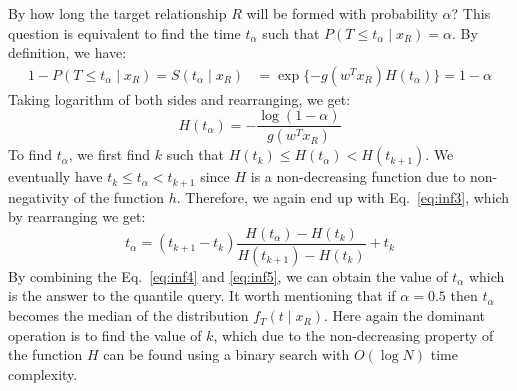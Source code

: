  By how long the target relationship $R$ will be formed with probability $\alpha$? This question is equivalent to find the time $t_\alpha$ such that $P(T \le t_\alpha\mid x_R)=\alpha$. By definition, we have:
\begin{equation*}
\begin{split}
1-P(T \le t_\alpha\mid x_R)=S(t_\alpha\mid x_R)&=\exp\{-g({w}^Tx_R){H}(t_\alpha)\}=1-\alpha
\end{split}
\end{equation*}
Taking logarithm of both sides and rearranging, we get:
\begin{equation}\label{eq:inf4}
{H}(t_\alpha)=-\frac{\log(1-\alpha)}{g({w}^Tx_R)}
\end{equation}
To find $t_\alpha$, we first find $k$ such that ${H}(t_k)\le{H}(t_\alpha)<{H}(t_{k+1})$.
We eventually have $t_k\le t_\alpha < t_{k+1}$ since $H$ is a non-decreasing function due to non-negativity of the function $h$. Therefore, we again end up with Eq.~\ref{eq:inf3}, which by rearranging we get:
\begin{equation}\label{eq:inf5}
t_\alpha=(t_{k+1}-t_k)\frac{{H}(t_\alpha)-{H}(t_k)}{{H}(t_{k+1})-{H}(t_k)}+t_k
\end{equation}
By combining the Eq.~\ref{eq:inf4} and \ref{eq:inf5}, we can obtain the value of $t_\alpha$ which is the answer to the quantile query. It worth mentioning that if $\alpha=0.5$ then $t_\alpha$ becomes the median of the distribution $f_T(t\mid x_R)$. Here again the dominant operation is to find the value of $k$, which due to the non-decreasing property of the function ${H}$ can be found using a binary search with $O(\log N)$ time complexity.\\


